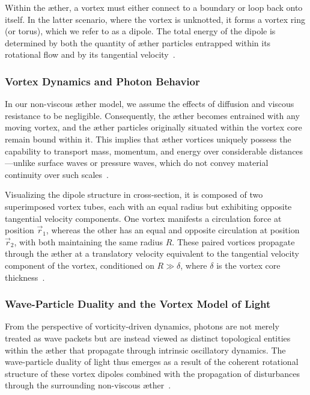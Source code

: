 \documentclass[a4paper,10pt]{article}
\begin{document}
Within the æther, a vortex must either connect to a boundary or loop back onto itself.
In the latter scenario, where the vortex is unknotted, it forms a vortex ring (or torus), which we refer to as a dipole.
The total energy of the dipole is determined by both the quantity of æther particles entrapped within its rotational flow and by its tangential velocity~\cite{kleckner2013, scalo2017}.

\subsubsection*{Vortex Dynamics and Photon Behavior}\label{subsubsec:vortex-dynamics-and-photon-behavior}
In our non-viscous æther model, we assume the effects of diffusion and viscous resistance to be negligible.
Consequently, the æther becomes entrained with any moving vortex, and the æther particles originally situated within the vortex core remain bound within it.
This implies that æther vortices uniquely possess the capability to transport mass, momentum, and energy over considerable distances—unlike surface waves or pressure waves, which do not convey material continuity over such scales~\cite{ricca1998, cahill2005}.

Visualizing the dipole structure in cross-section, it is composed of two superimposed vortex tubes, each with an equal radius but exhibiting opposite tangential velocity components.
One vortex manifests a circulation force at position $\vec{r}_1$, whereas the other has an equal and opposite circulation at position $\vec{r}_2$, with both maintaining the same radius $R$.
These paired vortices propagate through the æther at a translatory velocity equivalent to the tangential velocity component of the vortex, conditioned on $R \gg \delta$, where $\delta$ is the vortex core thickness~\cite{meunier2005}.

\subsubsection*{Wave-Particle Duality and the Vortex Model of Light}\label{subsubsec:wave-particle-duality}
From the perspective of vorticity-driven dynamics, photons are not merely treated as wave packets but are instead viewed as distinct topological entities within the æther that propagate through intrinsic oscillatory dynamics.
The wave-particle duality of light thus emerges as a result of the coherent rotational structure of these vortex dipoles combined with the propagation of disturbances through the surrounding non-viscous æther~\cite{kleckner2016, orlandi2021}.
\end{document}
